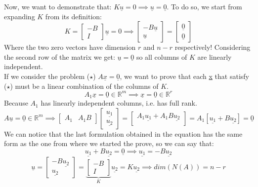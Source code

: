 Now, we want to demonstrate that: $K\underline{u} = 0 \implies \underline{u} = \underline{0}$. 
To do so, we start from expanding $K$ from its definition:
\[
    K = \begin{bmatrix}
        -B\\
        I
    \end{bmatrix}
    \underline{u} = 0
    \implies
    \begin{bmatrix}
        -B\underline{u}\\
        \underline{u}
    \end{bmatrix}
    = 
    \begin{bmatrix}
        \underline{0}\\
        \underline{0}
    \end{bmatrix}
\]
Where the two zero vectors have dimension $r$ and $n-r$ respectively! Considering the second row of the matrix we get: $\underline{u} = \underline{0}$ so all columns of $K$ are linearly independent.\\

If we consider the problem ($\star$) $A\underline{x} = \underline{0}$, we want to prove that each \underline{x} that satisfy ($\star$) must be a linear combination of the columns of $K$.\\
\[
    A_1\underline{x} = \underline{0} \in \mathbb{R}^m \implies \underline{x} = \underline{0} \in \mathbb{R}^r    
\]
Because $A_1$ has linearly independent columns, i.e. has full rank.
\[
    A\underline{u} = \underline{0} \in \mathbb{R}^m \implies \begin{bmatrix}
        A_1 & A_1B
    \end{bmatrix} 
    \begin{bmatrix}
        \underline{u_1}\\
        \underline{u_2}
    \end{bmatrix}  
    = 
    \begin{bmatrix}
        A_1\underline{u_1} + A_1B\underline{u_2}\\
    \end{bmatrix}
    = 
    A_1\left[\underline{u_1} + B\underline{u_2}\right]
    = \underline{0}
\]
We can notice that the last formulation obtained in the equation has the same form as the one from where we started the prove, so we can say that:
\[
    \underline{u_1} + B\underline{u_2} = \underline{0} \implies \underline{u_1} = -B\underline{u_2}    
\]
\[
   \underline{u} = \begin{bmatrix}
    -B\underline{u_2}\\
    \underline{u_2}
\end{bmatrix}
    =
\underbrace{\begin{bmatrix}
    -B\\
    I
\end{bmatrix}}_{K}
    \underline{u_2}
    = K\underline{u_2}
    \implies 
    dim(N(A)) = n - r
\]


